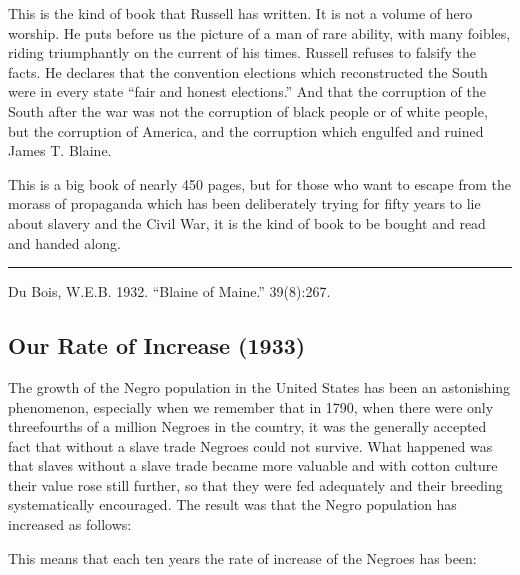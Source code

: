 \documentclass[letterpaper,10pt,english]{jupyterBook}
\begin{document}
\sphinxAtStartPar
This is the kind of book that Russell has written. It is not a volume of hero worship. He puts before us the picture of a man of rare ability, with many foibles, riding triumphantly on the current of his times. Russell refuses to falsify the facts. He declares that the convention elections which reconstructed the South were in every state “fair and honest elections.” And that the corruption of the South after the war was not the corruption of black people or of white people, but the corruption of America, and the corruption which engulfed and ruined James T. Blaine.

\sphinxAtStartPar
This is a big book of nearly 450 pages, but for those who want to escape from the morass of propaganda which has been deliberately trying for fifty years to lie about slavery and the Civil War, it is the kind of book to be bought and read and handed along.


\bigskip\hrule\bigskip


\sphinxAtStartPar
{} Du Bois, W.E.B. 1932. “Blaine of Maine.” 39(8):267.


\subsection{Our Rate of Increase (1933)}
\label{\detokenize{Volumes/40/02/our_rate_of_increase:our-rate-of-increase-1933}}\label{\detokenize{Volumes/40/02/our_rate_of_increase::doc}}
\sphinxAtStartPar
The  growth of the Negro  population in the United States has been an astonishing phenomenon, especially when we remember that in 1790, when there were only three\sphinxhyphen{}fourths of a million Negroes in the country, it was the generally accepted fact that without a slave trade Negroes could not survive. What happened was that slaves without a slave trade became more valuable and with cotton culture their value rose still further, so that they were fed adequately and their breeding systematically encouraged. The result was that the Negro population has increased as follows:

\sphinxAtStartPar
{}

\sphinxAtStartPar
{}

\sphinxAtStartPar
This means that each ten years the rate of increase of the Negroes has been:

\sphinxAtStartPar
{}
\end{document}
